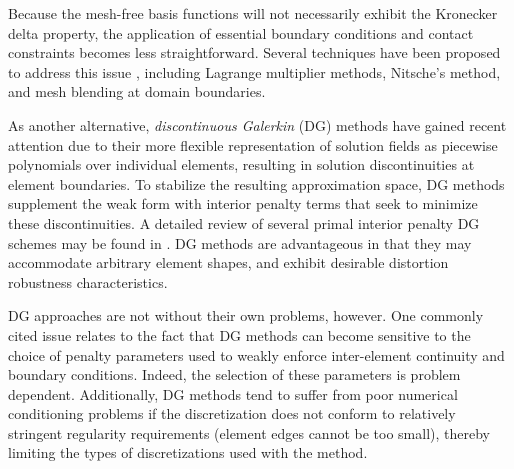 		
		
		Because the mesh-free basis functions will not necessarily exhibit the Kronecker delta property, the application of essential boundary conditions and contact constraints becomes less straightforward. Several techniques have been proposed to address this issue \cite{Mendez:04}, including Lagrange multiplier methods, Nitsche's method, and mesh blending at domain boundaries.
			
		As another alternative, \textit{discontinuous Galerkin} (DG) methods have gained recent attention due to their more flexible representation of solution fields as piecewise polynomials over individual elements, resulting in solution discontinuities at element boundaries. To stabilize the resulting approximation space, DG methods supplement the weak form with interior penalty terms that seek to minimize these discontinuities. A detailed review of several primal interior penalty DG schemes may be found in \cite{Riviere:08}. DG methods are advantageous in that they may accommodate arbitrary element shapes, and exhibit desirable distortion robustness characteristics.
		
		DG approaches are not without their own problems, however. One commonly cited issue relates to the fact that DG methods can become sensitive to the choice of penalty parameters used to weakly enforce inter-element continuity and boundary conditions. Indeed, the selection of these parameters is problem dependent. Additionally, DG methods tend to suffer from poor numerical conditioning problems if the discretization does not conform to relatively stringent regularity requirements \cite{Mu:14} (element edges cannot be too small), thereby limiting the types of discretizations used with the method.
		
			
		

